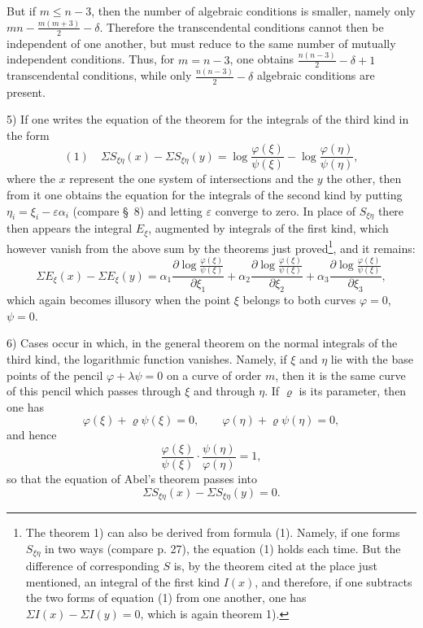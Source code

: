 \documentclass[10pt]{article}
\begin{document}
But if $m\leq n-3$, then the number of algebraic conditions is smaller, namely only $mn-\frac{m(m+3)}{2}-\delta$. Therefore the transcendental conditions cannot then be independent of one another, but must reduce to the same number of mutually independent conditions. Thus, for $m=n-3$, one obtains $\frac{n(n-3)}{2}-\delta+1$ transcendental conditions, while only $\frac{n(n-3)}{2}-\delta$ algebraic conditions are present.

5) If one writes the equation of the theorem for the integrals of the third kind in the form
\[
(1)\quad \Sigma S_{\xi\eta}(x)-\Sigma S_{\xi\eta}(y)
=\log\frac{\varphi(\xi)}{\psi(\xi)}-\log\frac{\varphi(\eta)}{\psi(\eta)},
\]
where the $x$ represent the one system of intersections and the $y$ the other, then from it one obtains the equation for the integrals of the second kind by putting $\eta_i=\xi_i-\varepsilon\alpha_i$ (compare \S\ 8) and letting $\varepsilon$ converge to zero. In place of $S_{\xi\eta}$ there then appears the integral $E_\xi$, augmented by integrals of the first kind, which however vanish from the above sum by the theorems just proved\footnote{The theorem 1) can also be derived from formula (1). Namely, if one forms $S_{\xi\eta}$ in two ways (compare p. 27), the equation (1) holds each time. But the difference of corresponding $S$ is, by the theorem cited at the place just mentioned, an integral of the first kind $I(x)$, and therefore, if one subtracts the two forms of equation (1) from one another, one has $\Sigma I(x)-\Sigma I(y)=0$, which is again theorem 1).}, and it remains:
\[
\Sigma E_\xi(x)-\Sigma E_\xi(y)
=\alpha_1\frac{\partial\log\frac{\varphi(\xi)}{\psi(\xi)}}{\partial\xi_1}
+\alpha_2\frac{\partial\log\frac{\varphi(\xi)}{\psi(\xi)}}{\partial\xi_2}
+\alpha_3\frac{\partial\log\frac{\varphi(\xi)}{\psi(\xi)}}{\partial\xi_3},
\]
which again becomes illusory when the point $\xi$ belongs to both curves $\varphi=0$, $\psi=0$.

6) Cases occur in which, in the general theorem on the normal integrals of the third kind, the logarithmic function vanishes. Namely, if $\xi$ and $\eta$ lie with the base points of the pencil $\varphi+\lambda\psi=0$ on a curve of order $m$, then it is the same curve of this pencil which passes through $\xi$ and through $\eta$. If $\varrho$ is its parameter, then one has
\[
\varphi(\xi)+\varrho\psi(\xi)=0,
\qquad
\varphi(\eta)+\varrho\psi(\eta)=0,
\]
and hence
\[
\frac{\varphi(\xi)}{\psi(\xi)}\cdot\frac{\psi(\eta)}{\varphi(\eta)}=1,
\]
so that the equation of Abel's theorem passes into
\[
\Sigma S_{\xi\eta}(x)-\Sigma S_{\xi\eta}(y)=0.
\]
\end{document}
